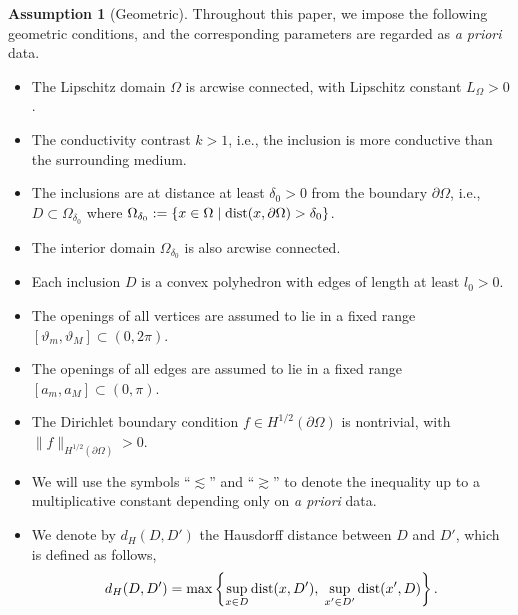 ﻿\documentclass[11pt,reqno,oneside]{amsart}
\theoremstyle{definition}
\newtheorem{assumption}[theorem]{Assumption}
\theoremstyle{remark}
\newcommand{\setdef}[2]{\left\lbrace {#1} \; \middle| \; {#2} \right\rbrace}
\newcommand{\dist}{{\rm dist}}
\renewcommand{\d}{\delta}
\newcommand{\p}{\partial}
\renewcommand{\O}{\Omega}
\begin{document}
 \medskip

 \begin{assumption}[Geometric]\label{assumption:geometric}
    Throughout this paper, we impose the following geometric conditions, and the corresponding parameters are regarded as {\it a priori} data.
 \begin{itemize}
    \item The Lipschitz domain $\O$ is arcwise connected, with Lipschitz constant $L_\O>0$.
    \item The conductivity contrast $k>1$, i.e., the inclusion is more conductive than the surrounding medium.
    \item The inclusions are at distance at least $\d_0>0$ from the boundary $\p\O$, i.e., $D\subset \O_{\d_0}$ where $\O_{\d_0}:=\setdef{x\in\O}{\dist(x,\p\O)>\d_0}$.
    \item The interior domain $\O_{\d_0}$ is also arcwise connected.
    \item Each inclusion $D$ is a convex polyhedron with edges of length at least $l_0>0$.
    \item The openings of all vertices are assumed to lie in a fixed range $[\vartheta_m,\vartheta_M]\subset (0,2\pi)$.
    \item The openings of all edges are assumed to lie in a fixed range $[a_m,a_M]\subset (0,\pi)$.
    \item The Dirichlet boundary condition $f\in H^{1/2}(\p\O)$ is nontrivial, with $\|f\|_{H^{1/2}(\p\O)}>0$.
 \end{itemize}
 \end{assumption}
 
 \medskip

 \begin{itemize}
    \item We will use the symbols ``$\lesssim$'' and ``$\gtrsim$'' to denote the inequality up to a multiplicative constant depending only on {\it a priori} data.
    \item We denote by $d_H(D,D')$ the Hausdorff distance between $D$ and $D'$, which is defined as follows,
    \begin{align*}
        d_H(D,D')=\max\left\lbrace \sup_{x\in D}\dist(x,D'),\; \sup_{x'\in D'}\dist(x',D) \right\rbrace.
    \end{align*}
 \end{itemize}  

 \medskip
\end{document}
